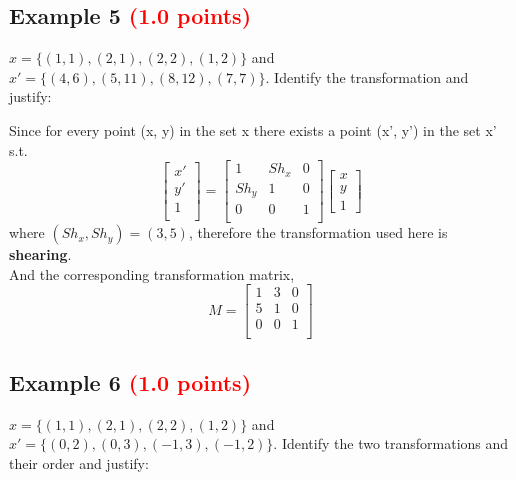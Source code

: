 \documentclass[answers]{exam}
\newcommand{\mypoints}[1]{\textcolor{red}{(#1 points)}}
\begin{document}
\subsection{Example 5 \mypoints{1.0}}
$x = \{(1,1), (2,1), (2,2), (1,2)\}$ and $x' = \{(4,6), (5,11), (8,12), (7,7)\}$. Identify the transformation and justify:
\begin{solution}
Since for every point (x, y) in the set x there exists a point (x', y') in the set x' s.t. \\
$$
\begin{bmatrix} 
x'\\
y'\\
1\\
\end{bmatrix}
=
\begin{bmatrix}
1 & Sh_x & 0\\
Sh_y & 1 & 0\\
0 & 0 & 1\\
\end{bmatrix}
\begin{bmatrix}
x\\
y\\
1
\end{bmatrix}
$$
where $(Sh_x, Sh_y) = (3, 5)$, therefore the transformation used here is \textbf{shearing}.\\
And the corresponding transformation matrix,\\
$$M = \begin{bmatrix}
1 & 3 & 0\\
5 & 1 & 0\\
0 & 0 & 1\\
\end{bmatrix}
$$
\end{solution}

\subsection{Example 6 \mypoints{1.0}}
$x = \{(1,1), (2,1), (2,2), (1,2)\}$ and $x' = \{(0,2), (0,3), (-1,3), (-1,2)\}$. Identify the two transformations and their order and justify:
\end{document}
